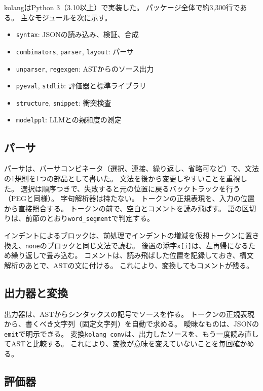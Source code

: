 \documentclass{ipsjprosym}
\begin{document}
kolangはPython 3（3.10以上）で実装した。
パッケージ全体で約3,300行である。
主なモジュールを次に示す。

\begin{itemize}
  \item \verb|syntax|: JSONの読み込み、検証、合成
  \item \verb|combinators|, \verb|parser|, \verb|layout|: パーサ
  \item \verb|unparser|, \verb|regexgen|: ASTからのソース出力
  \item \verb|pyeval|, \verb|stdlib|: 評価器と標準ライブラリ
  \item \verb|structure|, \verb|snippet|: 衝突検査
  \item \verb|modelppl|: LLMとの親和度の測定
\end{itemize}

\subsection{パーサ}

パーサは、パーサコンビネータ（選択、連接、繰り返し、省略可など）で、文法の1規則を1つの部品として書いた。
文法を後から変更しやすいことを重視した。
選択は順序つきで、失敗すると元の位置に戻るバックトラックを行う（PEGと同様）。
字句解析器は持たない。
トークンの正規表現を、入力の位置から直接照合する。
トークンの前で、空白とコメントを読み飛ばす。
語の区切りは、前節のとおり\verb|word_segment|で判定する。

インデントによるブロックは、前処理でインデントの増減を仮想トークンに置き換え、\verb|none|のブロックと同じ文法で読む。
後置の添字\verb|x[i]|は、左再帰になるため繰り返しで畳み込む。
コメントは、読み飛ばした位置を記録しておき、構文解析のあとで、ASTの文に付ける。
これにより、変換してもコメントが残る。

\subsection{出力器と変換}

出力器は、ASTからシンタックスの記号でソースを作る。
トークンの正規表現から、書くべき文字列（固定文字列）を自動で求める。
曖昧なものは、JSONの\verb|emit|で明示できる。
変換\verb|kolang conv|は、出力したソースを、もう一度読み直してASTと比較する。
これにより、変換が意味を変えていないことを毎回確かめる。

\subsection{評価器}
\end{document}
